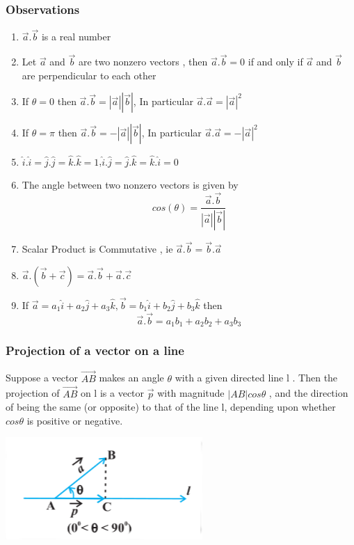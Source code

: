 \documentclass[12pt]{article}
\begin{document}
\begin{multicols*}{2}
\subsubsection*{Observations}
\begin{enumerate}
    \item $\vec{a}.\vec{b}$ is a real number
    \item Let $\vec{a}$ and $\vec{b}$ are two nonzero vectors , then $\vec{a}.\vec{b}=0$ if and only if $\vec{a}$ and $\vec{b}$ are perpendicular to each other 
    \item If $\theta=0$ then $\vec{a}.\vec{b}=|\vec{a}||\vec{b}|$, In particular $\vec{a}.\vec{a}=|\vec{a}|^2$
    \item  If $\theta=\pi$ then $\vec{a}.\vec{b}=-|\vec{a}||\vec{b}|$, In particular $\vec{a}.\vec{a}=-|\vec{a}|^2$
    \item $\hat{i}.\hat{i}=\hat{j}.\hat{j}=\hat{k}.\hat{k}=1$,$\hat{i}.\hat{j}=\hat{j}.\hat{k}=\hat{k}.\hat{i}=0$
    \item The angle between two nonzero vectors is given by $$cos(\theta)=\frac{\vec{a}.\vec{b}}{|\vec{a}||\vec{b}|}$$
    \item Scalar Product is Commutative , ie $\vec{a}.\vec{b}=\vec{b}.\vec{a}$
    \item $\vec{a}.(\vec{b}+\vec{c})=\vec{a}.\vec{b}+\vec{a}.\vec{c}$
    \item If $\vec{a}=a_1 \hat{i}+a_2 \hat{j}+a_3 \hat{k}, \vec{b}=b_1\hat{i}+b_2 \hat{j}+b_3 \hat{k}$ then $$\vec{a}.\vec{b}=a_1b_1+a_2b_2+a_3b_3$$
\end{enumerate}
\subsubsection*{Projection of a vector on a line}
Suppose a vector $\vec{AB}$ makes an angle $\theta$ with a given directed line l . Then the projection of $\vec{AB}$
on l is a vector $\vec{p}$ with magnitude $|AB| cos \theta$
, and the direction of being the same (or opposite)
to that of the line l, depending upon whether $cos \theta$ is positive or negative.

\begin{center}
    \includegraphics*[scale=0.5]{11.png}


\end{center}
\end{multicols*}
\end{document}
